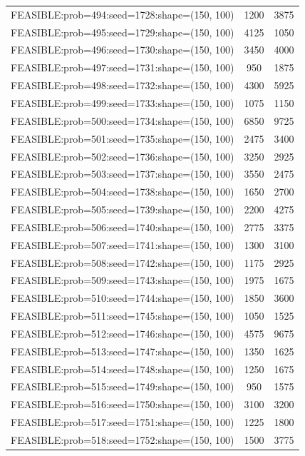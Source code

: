 \begin{longtable}{lcc}
FEASIBLE:prob=494:seed=1728:shape=(150, 100) &     1200 &  3875 \\
FEASIBLE:prob=495:seed=1729:shape=(150, 100) &     4125 &  1050 \\
FEASIBLE:prob=496:seed=1730:shape=(150, 100) &     3450 &  4000 \\
FEASIBLE:prob=497:seed=1731:shape=(150, 100) &      950 &  1875 \\
FEASIBLE:prob=498:seed=1732:shape=(150, 100) &     4300 &  5925 \\
FEASIBLE:prob=499:seed=1733:shape=(150, 100) &     1075 &  1150 \\
FEASIBLE:prob=500:seed=1734:shape=(150, 100) &     6850 &  9725 \\
FEASIBLE:prob=501:seed=1735:shape=(150, 100) &     2475 &  3400 \\
FEASIBLE:prob=502:seed=1736:shape=(150, 100) &     3250 &  2925 \\
FEASIBLE:prob=503:seed=1737:shape=(150, 100) &     3550 &  2475 \\
FEASIBLE:prob=504:seed=1738:shape=(150, 100) &     1650 &  2700 \\
FEASIBLE:prob=505:seed=1739:shape=(150, 100) &     2200 &  4275 \\
FEASIBLE:prob=506:seed=1740:shape=(150, 100) &     2775 &  3375 \\
FEASIBLE:prob=507:seed=1741:shape=(150, 100) &     1300 &  3100 \\
FEASIBLE:prob=508:seed=1742:shape=(150, 100) &     1175 &  2925 \\
FEASIBLE:prob=509:seed=1743:shape=(150, 100) &     1975 &  1675 \\
FEASIBLE:prob=510:seed=1744:shape=(150, 100) &     1850 &  3600 \\
FEASIBLE:prob=511:seed=1745:shape=(150, 100) &     1050 &  1525 \\
FEASIBLE:prob=512:seed=1746:shape=(150, 100) &     4575 &  9675 \\
FEASIBLE:prob=513:seed=1747:shape=(150, 100) &     1350 &  1625 \\
FEASIBLE:prob=514:seed=1748:shape=(150, 100) &     1250 &  1675 \\
FEASIBLE:prob=515:seed=1749:shape=(150, 100) &      950 &  1575 \\
FEASIBLE:prob=516:seed=1750:shape=(150, 100) &     3100 &  3200 \\
FEASIBLE:prob=517:seed=1751:shape=(150, 100) &     1225 &  1800 \\
FEASIBLE:prob=518:seed=1752:shape=(150, 100) &     1500 &  3775 \\

\end{longtable}
